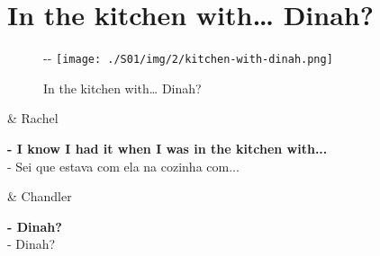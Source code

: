 \hypertarget{in-the-kitchen-with-dinah}{%
\section{In the kitchen with\ldots{}
Dinah?}\label{in-the-kitchen-with-dinah}}

\begin{figure}[!ht]
  \begin{adjustwidth}{-\oddsidemargin-1in}{-\rightmargin}
    \centering
    \texttt{[image: ./S01/img/2/kitchen-with-dinah.png]}
    \caption{In the kitchen with… Dinah?\label{fig:in-the-kitchen-with-dinah}}
  \end{adjustwidth}
\end{figure}

\begin{tcolorbox}[enhanced,center upper,
    drop fuzzy shadow southeast, boxrule=0.3pt,
    lower separated=false,
    colframe=black!30!dialogoBorder,colback=white]
\begin{minipage}[c]{0.14\linewidth}
   & \centering \scriptsize{Rachel}
\end{minipage}
\hspace{.1mm}
\begin{minipage}[c]{0.8\linewidth}
  \textbf{- I know I had it when I was in the kitchen with...}\\
  - Sei que estava com ela na cozinha com...
\end{minipage}

\medskip
\begin{minipage}[c]{0.14\linewidth}
   & \centering \scriptsize{Chandler}
\end{minipage}
\hspace{.1mm}
\begin{minipage}[c]{0.8\linewidth}
  \textbf{- Dinah?}\\
  - Dinah?
\end{minipage}
\end{tcolorbox}


